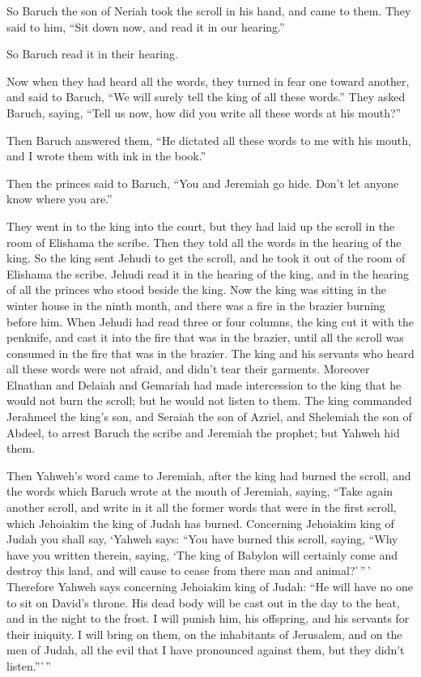 So Baruch the son of Neriah took the scroll in his hand, and came to
them.  They said to him, ``Sit down now, and read it in our
hearing.''

So Baruch read it in their hearing.

 Now when they had heard all the words, they turned in fear
one toward another, and said to Baruch, ``We will surely tell the king
of all these words.''  They asked Baruch, saying, ``Tell us
now, how did you write all these words at his mouth?''

 Then Baruch answered them, ``He dictated all these words
to me with his mouth, and I wrote them with ink in the book.''

 Then the princes said to Baruch, ``You and Jeremiah go
hide. Don't let anyone know where you are.''

 They went in to the king into the court, but they had laid
up the scroll in the room of Elishama the scribe. Then they told all the
words in the hearing of the king.  So the king sent Jehudi
to get the scroll, and he took it out of the room of Elishama the
scribe. Jehudi read it in the hearing of the king, and in the hearing of
all the princes who stood beside the king.  Now the king
was sitting in the winter house in the ninth month, and there was a fire
in the brazier burning before him.  When Jehudi had read
three or four columns, the king cut it with the penknife, and cast it
into the fire that was in the brazier, until all the scroll was consumed
in the fire that was in the brazier.  The king and his
servants who heard all these words were not afraid, and didn't tear
their garments.  Moreover Elnathan and Delaiah and Gemariah
had made intercession to the king that he would not burn the scroll; but
he would not listen to them.  The king commanded Jerahmeel
the king's son, and Seraiah the son of Azriel, and Shelemiah the son of
Abdeel, to arrest Baruch the scribe and Jeremiah the prophet; but Yahweh
hid them.

 Then Yahweh's word came to Jeremiah, after the king had
burned the scroll, and the words which Baruch wrote at the mouth of
Jeremiah, saying,  ``Take again another scroll, and write
in it all the former words that were in the first scroll, which
Jehoiakim the king of Judah has burned.  Concerning
Jehoiakim king of Judah you shall say, `Yahweh says: ``You have burned
this scroll, saying, ``Why have you written therein, saying, `The king
of Babylon will certainly come and destroy this land, and will cause to
cease from there man and animal?'\,''\,'  Therefore Yahweh
says concerning Jehoiakim king of Judah: ``He will have no one to sit on
David's throne. His dead body will be cast out in the day to the heat,
and in the night to the frost.  I will punish him, his
offspring, and his servants for their iniquity. I will bring on them, on
the inhabitants of Jerusalem, and on the men of Judah, all the evil that
I have pronounced against them, but they didn't listen.'''\,''

